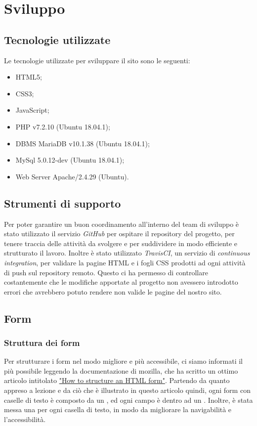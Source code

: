 \documentclass[12pt]{article}
\begin{document}
	\section{Sviluppo}
	\subsection{Tecnologie utilizzate}
	Le tecnologie utilizzate per sviluppare il sito sono le seguenti:
	\begin{itemize}
		\item HTML5;
		\item CSS3;
		\item JavaScript;
		\item PHP v7.2.10 (Ubuntu 18.04.1);
		\item DBMS MariaDB v10.1.38 (Ubuntu 18.04.1);
		\item MySql 5.0.12-dev (Ubuntu 18.04.1);
		\item Web Server Apache/2.4.29 (Ubuntu).
	\end{itemize}
	\subsection{Strumenti di supporto}
	Per poter garantire un buon coordinamento all'interno del team di sviluppo è stato utilizzato il servizio \emph{GitHub} per ospitare il repository del progetto, per tenere traccia delle attività da svolgere e per suddividere in modo efficiente e strutturato il lavoro. Inoltre è stato utilizzato \emph{TravisCI}, un servizio di \emph{continuous integration}, per validare la pagine HTML e i fogli CSS prodotti ad ogni attività di push sul repository remoto. Questo ci ha permesso di controllare costantemente che le modifiche apportate al progetto non avessero introdotto errori che avrebbero potuto rendere non valide le pagine del nostro sito.
	\subsection{Form}
	\subsubsection{Struttura dei form}
	Per strutturare i form nel modo migliore e più accessibile, ci siamo informati il più possibile leggendo la documentazione di mozilla, che ha scritto un ottimo articolo intitolato \href{https://developer.mozilla.org/en-US/docs/Learn/HTML/Forms/How_to_structure_an_HTML_form}{"How to structure an HTML form"}. Partendo da quanto appreso a lezione e da ciò che è illustrato in questo articolo quindi, ogni form con caselle di testo è composto da un \textit{}, ed ogni campo è dentro ad un \textit{}. Inoltre, è stata messa una \textit{} per ogni casella di testo, in modo da migliorare la navigabilità e l'accessibilità.
	
\end{document}
